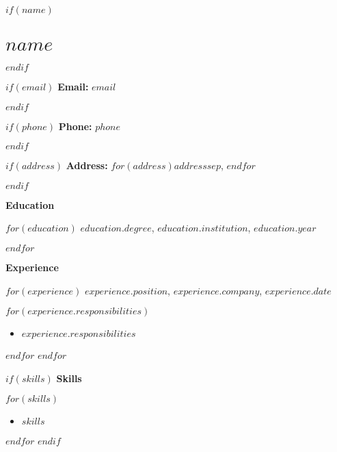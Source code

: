 \documentclass{article}
\newcommand{\cvsection}[1]{\vspace{0.5em}\noindent\textbf{\large #1}\par}
\newcommand{\cveducation}[3]{\noindent\textbf{#1}, \emph{#2}, #3\par}
\newcommand{\cvexperience}[4]{\noindent\textbf{#1}, \emph{#2}, #3\par#4\vspace{0.5em}}
\begin{document}
$if(name)$
\section*{$name$}
$endif$

$if(email)$
\noindent\textbf{Email:} $email$\par
$endif$

$if(phone)$
\noindent\textbf{Phone:} $phone$\par
$endif$

$if(address)$
\noindent\textbf{Address:} $for(address)$$address$$sep$, $endfor$\par
$endif$

\cvsection{Education}

$for(education)$
\cveducation{$education.degree$}{$education.institution$}{$education.year$}
$endfor$

\cvsection{Experience}

$for(experience)$
\cvexperience{$experience.position$}{$experience.company$}{$experience.date$}{$for(experience.responsibilities)$\begin{itemize}[label={--}]
\item $experience.responsibilities$
\end{itemize}$endfor$}
$endfor$

$if(skills)$
\cvsection{Skills}
$for(skills)$
\begin{itemize}[label={--}]
\item $skills$
\end{itemize}
$endfor$
$endif$
\end{document}
